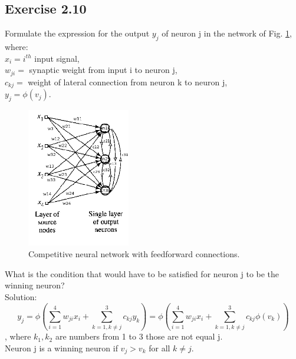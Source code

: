 \documentclass[a4paper, 12pt]{article}
\begin{document}
\subsection{Exercise 2.10}

Formulate the expression for the output $y_j$ of neuron j in the network of Fig. \ref{fig:competiotionNN}, where:\\

$x_i = i^{th}$ input signal,\\
$w_{ji} = $ synaptic weight from input i to neuron j,\\
$c_{kj} = $ weight of lateral connection from neuron k to neuron j,\\
$y_j = \phi(v_j)$.\\


 
\begin{figure}[h]
  \centering
  \caption{Competitive neural network with feedforward connections.\label{fig:competiotionNN}}
  \includegraphics[width=0.4\textwidth]{competiotionNN}
\end{figure}

What is the condition that would have to be satisfied for neuron j to be the winning neuron?\\

Solution:\\

$$y_j = \phi(\sum_{i=1}^{4} w_{ji}x_i  + \sum_{k=1, k \neq j}^{3} c_{kj}y_k) = \phi(\sum_{i=1}^{4} w_{ji}x_i + \sum_{k=1, k \neq j}^{3} c_{kj}\phi(v_k))$$, where $k_1, k_2$ are numbers from 1 to 3 those are not equal j.\\

Neuron j is a winning neuron if $v_j > v_k$ for all $k \neq j$.
\end{document}
